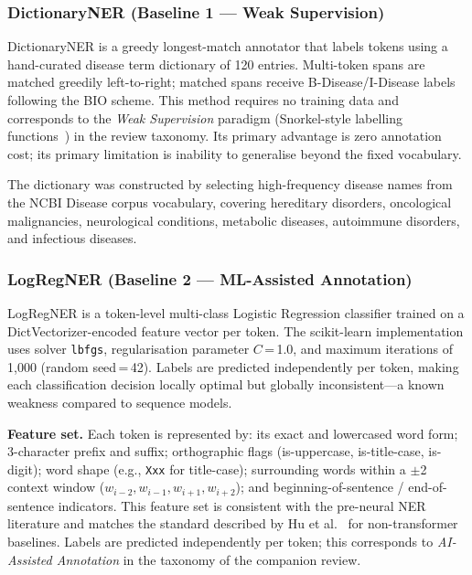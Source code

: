 \documentclass[sigconf,nonacm]{acmart}
\begin{document}
\subsubsection{DictionaryNER (Baseline 1 — Weak Supervision)}

DictionaryNER is a greedy longest-match annotator that labels tokens using a hand-curated disease term dictionary of 120 entries. Multi-token spans are matched greedily left-to-right; matched spans receive B-Disease/I-Disease labels following the BIO scheme. This method requires no training data and corresponds to the \emph{Weak Supervision} paradigm (Snorkel-style labelling functions~\cite{karim2025}) in the review taxonomy. Its primary advantage is zero annotation cost; its primary limitation is inability to generalise beyond the fixed vocabulary.

The dictionary was constructed by selecting high-frequency disease names from the NCBI Disease corpus vocabulary, covering hereditary disorders, oncological malignancies, neurological conditions, metabolic diseases, autoimmune disorders, and infectious diseases.

\subsubsection{LogRegNER (Baseline 2 — ML-Assisted Annotation)}

LogRegNER is a token-level multi-class Logistic Regression classifier trained on a DictVectorizer-encoded feature vector per token. The scikit-learn implementation uses solver \texttt{lbfgs}, regularisation parameter $C$\,=\,1.0, and maximum iterations of 1,000 (random seed\,=\,42). Labels are predicted independently per token, making each classification decision locally optimal but globally inconsistent---a known weakness compared to sequence models.

\medskip\noindent\textbf{Feature set.} Each token is represented by: its exact and lowercased word form; 3-character prefix and suffix; orthographic flags (is-uppercase, is-title-case, is-digit); word shape (e.g., \texttt{Xxx} for title-case); surrounding words within a $\pm$2 context window ($w_{i-2}, w_{i-1}, w_{i+1}, w_{i+2}$); and beginning-of-sentence / end-of-sentence indicators.
This feature set is consistent with the pre-neural NER literature and matches the standard described by Hu et al.~\cite{hu2024} for non-transformer baselines. Labels are predicted independently per token; this corresponds to \emph{AI-Assisted Annotation} in the taxonomy of the companion review.
\end{document}

